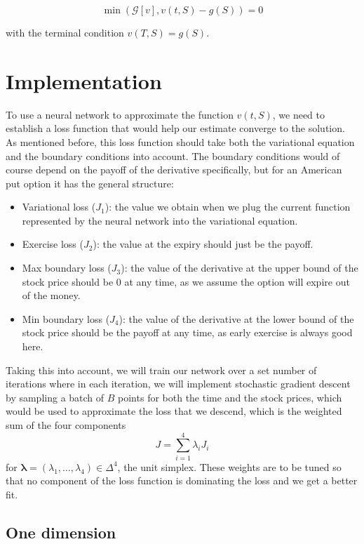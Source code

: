 $$
\min\left(\mathcal G[v], v(t, S)  - g(S)\right) = 0
$$

with the terminal condition $v(T, S) = g(S)$.


\section{Implementation}

To use a neural network to approximate the function $v(t, S)$, we need to establish a loss function that would help our estimate converge to the solution. As mentioned before, this loss function should take both the variational equation and the boundary conditions into account. The boundary conditions would of course depend on the payoff of the derivative specifically, but for an American put option it has the general structure:

\begin{itemize}
    \item Variational loss ($J_1$): the value we obtain when we plug the current function represented by the neural network into the variational equation.
    \item Exercise loss ($J_2$): the value at the expiry should just be the payoff.
    \item Max boundary loss ($J_3$): the value of the derivative at the upper bound of the stock price should be $0$ at any time, as we assume the option will expire out of the money.
    \item Min boundary loss ($J_4$): the value of the derivative at the lower bound of the stock price should be the payoff at any time, as early exercise is always good here.
\end{itemize}

Taking this into account, we will train our network over a set number of iterations where in each iteration, we will implement stochastic gradient descent by sampling a batch of $B$ points for both the time and the stock prices, which would be used to approximate the loss that we descend, which is the weighted sum of the four components
$$J = \sum_{i=1}^4 \lambda_iJ_i$$
for $\bm \lambda = (\lambda_1, \dots, \lambda_4) \in \Delta^4$, the unit simplex. These weights are to be tuned so that no component of the loss function is dominating the loss and we get a better fit.

\subsection{One dimension}

